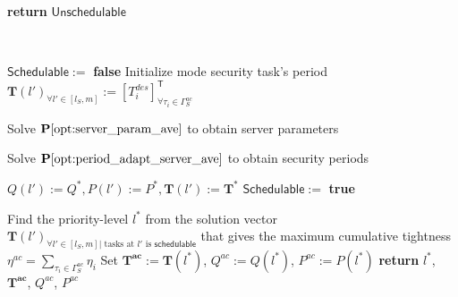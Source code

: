 \documentclass[../rt_server_main.tex]{subfiles}
\begin{document}
\begin{algorithm}[!ht]
\begin{algorithmic}[1]
\begin{ALC@g}
                    \ENDIF
                    \ELSE
\STATE {}	                   \STATE \textbf{return} $\mathsf{Unschedulable}$  
                    \ENDIF
        
    \end{ALC@g}
              
    \STATE \EndFunction
     \\\hrulefill 
  \vspace*{0.5em}

    
  \STATE 
  
  \begin{ALC@g}
  \STATE $\mathsf{Schedulable} :=$ \textbf{false}
                    \STATE Initialize \ave mode security task's period $\mathbf{T}(l')_{\forall l' \in [l_S, m]} := [T_i^{des}]_{\forall \tau_i \in \Gamma_S^{ac}}^{\mathsf{T}}$ 
					
					
					\STATE Solve $\mathbf{P}\mathbf{\ref{opt:server_param_ave}}$ to obtain server parameters
					
                    \STATE Solve $\mathbf{P}\mathbf{\ref{opt:period_adapt_server_ave}}$ to obtain security periods
                    
					
                    \STATE {}
                    \STATE $Q(l'):= Q^*, P(l'):=P^*, \mathbf{T}(l') := \mathbf{T}^*$ 	
                    \STATE $\mathsf{Schedulable} :=$ \textbf{true}
                    \ENDIF
                    
					
					\ENDIF
					\ENDFOR	
                    \STATE {}
                    \STATE Find the priority-level $l^*$ from the solution vector $\mathbf{T}(l')_{\forall l' \in [l_S,m] | \text{~tasks at~} l' \text{~is~} \mathsf{schedulable}}$ that gives the maximum cumulative tightness $\eta^{ac} = \sum_{\tau_i \in \Gamma_S^{ac}} \eta_i$
                    \STATE Set $\mathbf{T}^{\boldsymbol{ac}} := \mathbf{T}(l^*)$, $Q^{ac} := Q(l^*)$, $P^{ac} := P(l^*)$
                    \STATE {}
                    \STATE \textbf{return} $l^*$, $\mathbf{T}^{\boldsymbol{ac}}$, $Q^{ac}$, $P^{ac}$
                    

\end{ALC@g}
\end{algorithmic}
\end{algorithm}
\end{document}
